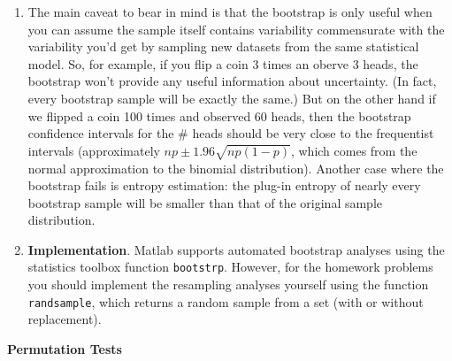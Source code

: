 \documentclass[11pt]{article}
\renewcommand{\tt}{\texttt}
\begin{document}
\begin{itemize}
\begin{enumerate}
\item The main caveat to bear in mind is that the bootstrap is only
  useful when you can assume the sample itself contains variability
  commensurate with the variability you'd get by sampling new datasets
  from the same statistical model.  So, for example, if you flip a
  coin 3 times an oberve 3 heads, the bootstrap won't provide any
  useful information about uncertainty.  (In fact, every bootstrap
  sample will be exactly the same.)  But on the other hand if we
  flipped a coin 100 times and observed 60 heads, then the bootstrap
  confidence intervals for the \# heads should be very close to the
  frequentist intervals (approximately $np \pm 1.96 \sqrt{n p(1-p)}$,
  which comes from the normal approximation to the binomial
  distribution).  Another case where the bootstrap fails is entropy
  estimation: the plug-in entropy of nearly every bootstrap sample
  will be smaller than that of the original sample distribution. 

\item {\bf Implementation}.  Matlab supports automated bootstrap
  analyses using the statistics toolbox function \tt{bootstrp}.
  However, for the homework problems you should implement the
  resampling analyses yourself using the function \tt{randsample},
  which returns a random sample from a set (with or without
  replacement).

\end{enumerate}


\end{itemize}

{\bf Permutation Tests}
\end{document}
